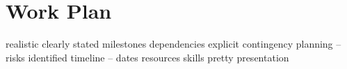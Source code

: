 \chapter{Work Plan}

realistic
clearly stated milestones
dependencies explicit
contingency planning – risks identified
timeline – dates
resources
skills
pretty presentation
